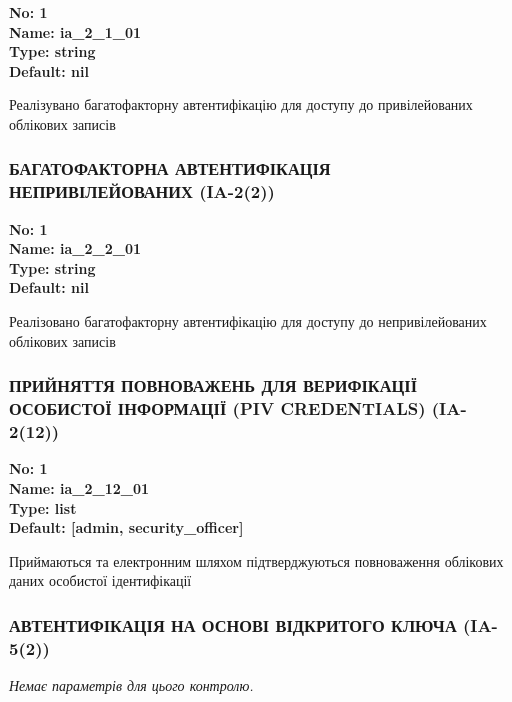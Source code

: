 \documentclass{article}
\begin{document}
\vspace{10pt}
{\footnotesize\bfseries
No: 1\\
Name: ia\_2\_1\_01\\
Type: string\\
Default: nil
}

{\footnotesize Реалізувано багатофакторну автентифікацію для доступу до привілейованих облікових записів}




\subsubsection{БАГАТОФАКТОРНА АВТЕНТИФІКАЦІЯ НЕПРИВІЛЕЙОВАНИХ (IA-2(2))}


\vspace{10pt}
{\footnotesize\bfseries
No: 1\\
Name: ia\_2\_2\_01\\
Type: string\\
Default: nil
}

{\footnotesize Реалізовано багатофакторну автентифікацію для доступу до непривілейованих облікових записів}




\subsubsection{ПРИЙНЯТТЯ ПОВНОВАЖЕНЬ ДЛЯ ВЕРИФІКАЦІЇ ОСОБИСТОЇ ІНФОРМАЦІЇ (PIV CREDENTIALS) (IA-2(12))}


\vspace{10pt}
{\footnotesize\bfseries
No: 1\\
Name: ia\_2\_12\_01\\
Type: list\\
Default: [\textquotedbl{}admin\textquotedbl{}, \textquotedbl{}security\_officer\textquotedbl{}]
}

{\footnotesize Приймаються та електронним шляхом підтверджуються повноваження облікових даних особистої ідентифікації}




\subsubsection{АВТЕНТИФІКАЦІЯ НА ОСНОВІ ВІДКРИТОГО КЛЮЧА (IA-5(2))}


\vspace{10pt}
\textit{Немає параметрів для цього контролю.}
\vspace{10pt}
\end{document}
